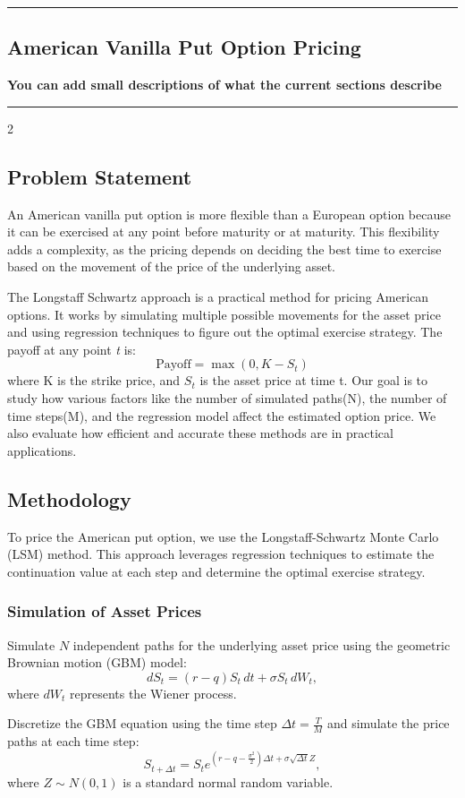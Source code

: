 {\color{gray}\hrule}
\begin{center}
\section{American Vanilla Put Option Pricing}
\textbf{You can add small descriptions of what the current sections describe}
\bigskip
\end{center}
{\color{gray}\hrule}
\begin{multicols}{2}
\subsection{Problem Statement}
An American vanilla put option is more flexible than a European option because it can be exercised at any point before maturity or at maturity. This flexibility adds a complexity, as the pricing depends on deciding the best time to exercise based on the movement of the price of the underlying asset.

The Longstaff Schwartz approach is a practical method for pricing American options. It works by simulating multiple possible movements for the asset price and using regression techniques to figure out the optimal exercise strategy. The payoff at any point \textit{t} is:
\[\text{Payoff} = \max(0, K - S_t)
\]
where K is the strike price, and $S_t$ is the asset price at time t.
Our goal is to study how various factors like the number of simulated paths(N), the number of time steps(M), and the regression model affect the estimated option price. We also evaluate how efficient and accurate these methods are in practical applications.
\subsection{Methodology}
To price the American put option, we use the Longstaff-Schwartz Monte Carlo (LSM) method. This approach leverages regression techniques to estimate the continuation value at each step and determine the optimal exercise strategy.
\subsubsection{Simulation of Asset Prices}
Simulate \(N\) independent paths for the underlying asset price using the geometric Brownian motion (GBM) model:
\[
dS_t = (r - q) S_t \, dt + \sigma S_t \, dW_t,
\]
where \(dW_t\) represents the Wiener process.

Discretize the GBM equation using the time step \(\Delta t = \frac{T}{M}\) and simulate the price paths at each time step:
\[
S_{t+\Delta t} = S_t e^{(r - q - \frac{\sigma^2}{2}) \Delta t + \sigma \sqrt{\Delta t} Z},
\]
where \(Z \sim N(0,1)\) is a standard normal random variable.


\end{multicols}
